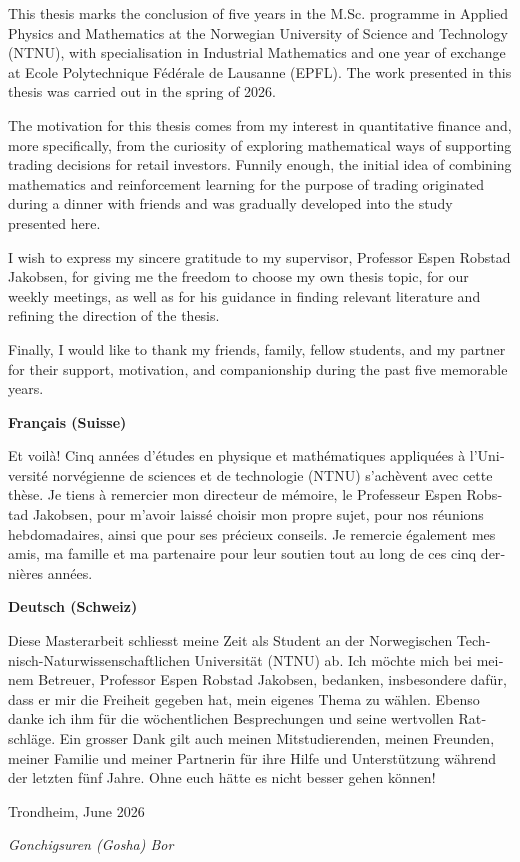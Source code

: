 This thesis marks the conclusion of five years in the M.Sc. programme in Applied Physics and Mathematics at the Norwegian University of Science and Technology (NTNU), with specialisation in Industrial Mathematics and one year of exchange at Ecole Polytechnique Fédérale de Lausanne (EPFL). The work presented in this thesis was carried out in the spring of 2026.

\noindent
The motivation for this thesis comes from my interest in quantitative finance and, more specifically, from the curiosity of exploring mathematical ways of supporting trading decisions for retail investors. Funnily enough, the initial idea of combining mathematics and reinforcement learning for the purpose of trading originated during a dinner with friends and was gradually developed into the study presented here. 

\noindent
I wish to express my sincere gratitude to my supervisor, Professor Espen Robstad Jakobsen, for giving me the freedom to choose my own thesis topic, for our weekly meetings, as well as for his guidance in finding relevant literature and refining the direction of the thesis.

\noindent
Finally, I would like to thank my friends, family, fellow students, and my partner for their support, motivation, and companionship during the past five memorable years.

\vspace{1.5em}

\begin{otherlanguage}{french}
\noindent\textbf{Français (Suisse)}

\medskip

\noindent
Et voilà! Cinq années d'études en physique et mathématiques appliquées à l'Université norvégienne de sciences et de technologie (NTNU) s'achèvent avec cette thèse. Je tiens à remercier mon directeur de mémoire, le Professeur Espen Robstad Jakobsen, pour m'avoir laissé choisir mon propre sujet, pour nos réunions hebdomadaires, ainsi que pour ses précieux conseils. Je remercie également mes amis, ma famille et ma partenaire pour leur soutien tout au long de ces cinq dernières années.
\end{otherlanguage}

\vspace{1.5em}

\begin{otherlanguage}{nswissgerman}
\noindent\textbf{Deutsch (Schweiz)}

\medskip

\noindent
Diese Masterarbeit schliesst meine Zeit als Student an der Norwegischen Technisch-Naturwissenschaftlichen Universität (NTNU) ab. Ich möchte mich bei meinem Betreuer, Professor Espen Robstad Jakobsen, bedanken, insbesondere dafür, dass er mir die Freiheit gegeben hat, mein eigenes Thema zu wählen. Ebenso danke ich ihm für die wöchentlichen Besprechungen und seine wertvollen Ratschläge. Ein grosser Dank gilt auch meinen Mitstudierenden, meinen Freunden, meiner Familie und meiner Partnerin für ihre Hilfe und Unterstützung während der letzten fünf Jahre. Ohne euch hätte es nicht besser gehen können!
\end{otherlanguage}

\vspace{3em}

\noindent
Trondheim, June 2026

\kern -4pt

\noindent
\textit{Gonchigsuren (Gosha) Bor}
